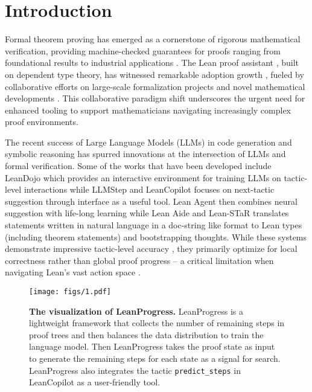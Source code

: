 \section{Introduction}
\label{sec:introduction}

Formal theorem proving \citep{avigad2023mathematicsformalturn} has emerged as a cornerstone of rigorous mathematical verification, providing machine-checked guarantees for proofs ranging from foundational results \citep{gowers2023conjecturemarton} to industrial applications \citep{liquid2022}. The Lean proof assistant \citep{lean}, built on dependent type theory, has witnessed remarkable adoption growth \citep{best_et_al:LIPIcs.ITP.2023.36}, fueled by collaborative efforts on large-scale formalization projects \citep{mathlib} and novel mathematical developments \citep{asgeirsson:LIPIcs.ITP.2024.6}. This collaborative paradigm shift underscores the urgent need for enhanced tooling to support mathematicians navigating increasingly complex proof environments.

The recent success of Large Language Models (LLMs) in code generation \citep{rozière2024codellamaopenfoundation} and symbolic reasoning \citep{yu2024natural} has spurred innovations at the intersection of LLMs and formal verification. Some of the works that have been developed include LeanDojo \citep{yang2024leandojo} which provides an interactive environment for training LLMs on tactic-level interactions while LLMStep \citep{welleck2023llmstep} and {LeanCopilot} \citep{song2024largelanguagemodelscopilots} focuses on next-tactic suggestion through interface as a useful tool. {Lean Agent} \citep{kumarappan2024leanagentlifelonglearningformal} then combines neural suggestion with life-long learning while Lean Aide \citep{agrawal2022mathematicsformalisationassistantusing} and Lean-STaR\citep{lin2024leanstarlearninginterleavethinking} translates statements written in natural language in a doc-string like format to Lean types (including theorem statements) and bootstrapping thoughts. While these systems demonstrate impressive tactic-level accuracy \citep{10.1007/978-3-031-46002-9_25}, they primarily optimize for local correctness rather than global proof progress -- a critical limitation when navigating Lean's vast action space \citep{nawrocki_et_al:LIPIcs.ITP.2023.24}.

\begin{figure*}[h]
    \centering
    \texttt{[image: figs/1.pdf]} 
    \caption{ \textbf{The visualization of LeanProgress.} LeanProgress is a lightweight framework that collects the number of remaining steps in proof trees and then balances the data distribution to train the language model. Then LeanProgress takes the proof state as input to generate the remaining steps for each state as a signal for search. LeanProgress also integrates the tactic \texttt{predict\_steps} in LeanCopilot as a user-friendly tool.}
    \label{fig:intro}
\end{figure*}

